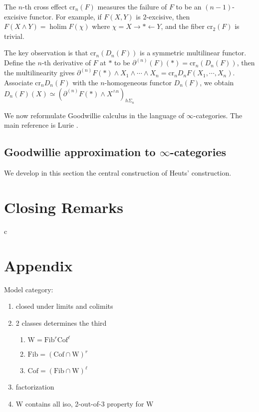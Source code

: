 \documentclass[psamsfonts]{amsart}
\theoremstyle{definition}
\theoremstyle{remark}
\newcommand{\W}{\mathrm{W}}
\newcommand{\cros}{\mathrm{cr}}
\newcommand{\Cof}{\mathrm{Cof}}
\newcommand{\Fib}{\mathrm{Fib}}
\DeclareMathOperator{\holim}{holim}
\numberwithin{equation}{section}
\begin{document}
The $n$-th cross effect $\cros_n(F)$ measures the failure of $F$ to be an $(n-1)$-excisive functor. For example, if $F(X,Y)$ is $2$-excisive, then $F(X\wedge Y)=\holim F(\chi)$ where $\chi=X\rightarrow\ast\leftarrow Y$, and the fiber $\cros_2(F)$ is trivial.

The key observation is that $\cros_n(D_n(F))$ is a symmetric multilinear functor. Define the $n$-th derivative of $F$ at $\ast$ to be $\partial^{(n)}(F)(\ast)=\cros_n(D_n(F))$, then the multilinearity gives $\partial^{(n)}F(\ast)\wedge X_1\wedge\cdots\wedge X_n=\cros_nD_nF(X_1,\cdots,X_n)$. Associate $\cros_nD_n(F)$ with the $n$-homogeneous functor $D_n(F)$, we obtain $D_n(F)(X)\simeq(\partial^{(n)}F(\ast)\wedge X^{\wedge n})_{h\Sigma_n}$

\medbreak
We now reformulate Goodwillie calculus in the language of $\infty$-categories. The main reference is Lurie \cite{Lurie}.

\subsection{Goodwillie approximation to $\infty$-categories} We develop in this section the central construction of Heuts' construction.

\newpage
\section{Closing Remarks}
c

\newpage
\section*{Appendix}

Model category:\begin{enumerate}
    \item closed under limits and colimits
    \item 2 classes determines the third \begin{enumerate}
        \item $\W=\Fib^r\Cof^\ell$
        \item $\Fib=(\Cof\cap\W)^r$
        \item $\Cof=(\Fib\cap\W)^\ell$
    \end{enumerate}
    \item factorization
    \item $\W$ contains all iso, 2-out-of-3 property for $\W$
\end{enumerate}
\end{document}
